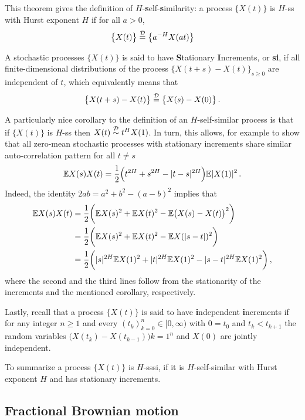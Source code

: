 This theorem gives the definition of $H$-\textbf{s}elf-\textbf{s}imilarity: \label{def:hsssi}
a process $\bigl\{X(t)\bigr\}$ is $H$-ss with Hurst exponent $H$ if for all $a>0$,
\[ \bigl\{X(t)\bigr\} \overset{\mathcal{D}}{=} \bigl\{a^{-H} X(at)\bigr\} \]

A stochastic processes $\bigl\{X(t)\bigr\}$ is said to have \textbf{S}tationary
\textbf{I}ncrements, or \textbf{si}, if all finite-dimensional distributions of
the process $\bigl\{X(t+s) - X(t)\bigr\}_{s\geq0}$ are independent of $t$, which
equivalently means that
\[ \bigl\{X(t+s)-X(t)\bigr\} \overset{\mathcal{D}}{=} \bigl\{X(s)-X(0)\bigr\} \,. \]

A particularly nice corollary to the definition of an $H$-self-similar process is that
if $\bigl\{X(t)\bigr\}$ is $H$-ss then $X(t)\overset{\mathcal{D}}{\sim}t^H X(1)$. In turn,
this allows, for example to show that all zero-mean stochastic processes with stationary
increments share similar auto-correlation pattern for all $t\neq s$
\[ \mathbb{E} X(s) X(t) = \frac{1}{2}\Bigl( t^{2H} + s^{2H} - |t-s|^{2H}\Bigr) \mathbb{E}|X(1)|^2 \,. \]
Indeed, the identity $2 a b = a^2 + b^2 - (a-b)^2$ implies that\begin{align*}
	\mathbb{E} X(s) X(t)
	&= \frac{1}{2}\biggl( \mathbb{E} X(s)^2 + \mathbb{E} X(t)^2 - \mathbb{E}\bigl( X(s) - X(t) \bigr)^2 \biggr) \\
	&= \frac{1}{2}\biggl( \mathbb{E} X(s)^2 + \mathbb{E} X(t)^2 - \mathbb{E} X(|s-t|)^2 \biggr) \\
	&= \frac{1}{2}\biggl( |s|^{2H} \mathbb{E} X(1)^2 + |t|^{2H} \mathbb{E} X(1)^2 - |s-t|^{2H} \mathbb{E} X(1)^2 \biggr) \,,
\end{align*}
where the second and the third lines follow from the stationarity of the increments
and the mentioned corollary, respectively.

Lastly, recall that a process $\bigl\{X(t)\bigr\}$ is said to have \textbf{i}ndependent
\textbf{i}ncrements if for any integer $n\geq1$ and every $(t_k)_{k=0}^n\in[0,\infty)$
with $0=t_0$ and $t_k < t_{k+1}$ the random variables $\bigl(X(t_k) - X(t_{k-1})\bigr){k=1}^n$
and $X(0)$ are jointly independent.

To summarize a process $\bigl\{X(t)\bigr\}$ is $H$-sssi, if it is $H$-self-similar
with Hurst exponent $H$ and has stationary increments.


\subsection{Fractional Brownian motion} %
\label{sub:fractional_brownian_motion}


